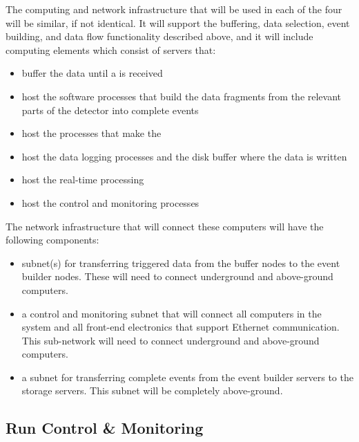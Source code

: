 
The computing and network infrastructure that will be used in each
of the four  will be similar, if not identical.
It will support the buffering, data selection, event
building, and data flow functionality described
above, and it will include computing elements which consist of servers that:

\begin{itemize}
\item buffer the data until a 
  is received
\item host the software processes that
  build the data fragments from the relevant
  parts of the detector into complete events
\item host the processes that make the
\item host the data logging processes and
  the disk buffer where the data is written
\item host the real-time  processing
\item host the control and monitoring processes
\end{itemize}

The network infrastructure that will connect these computers
will have the following components:

\begin{itemize}
\item subnet(s) for transferring triggered data from the buffer
  nodes to the event builder nodes.  These will need to
  connect underground and above-ground computers.
\item a control and monitoring subnet that will connect all
  computers in the  system and all front-end
  electronics that support Ethernet communication.  This
  sub-network will need to connect underground and
  above-ground computers.
\item a subnet for transferring complete events from the
  event builder servers to the storage servers.  This subnet
  will be completely above-ground.
\end{itemize}

\subsection{Run Control \& Monitoring}
\label{sec:fdsp-daq-tcm}


